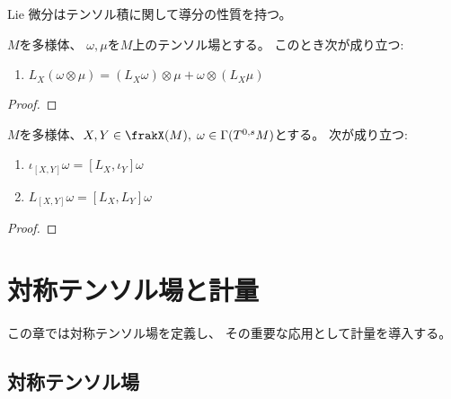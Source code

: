 \documentclass[report]{jlreq}
\begin{document}
Lie 微分はテンソル積に関して導分の性質を持つ。

\begin{proposition}
    $M$を多様体、
    $\omega, \mu$を$M$上のテンソル場とする。
    このとき次が成り立つ:
    \begin{enumerate}
        \item $L_X (\omega \otimes \mu)
            = (L_X \omega) \otimes \mu + \omega \otimes (L_X \mu)$
    \end{enumerate}
\end{proposition}

\begin{proof}
    \TODO{}
\end{proof}

\begin{proposition}
    $M$を多様体、$X, Y \in \frakX(M), \; \omega \in \Gamma(T^{0, s} M)$とする。
    次が成り立つ:
    \begin{enumerate}
        \item $\iota_{[X, Y]} \omega = [L_X, \iota_Y] \omega$
        \item $L_{[X, Y]} \omega = [L_X, L_Y] \omega$
    \end{enumerate}
\end{proposition}

\begin{proof}
    \TODO{}
\end{proof}

\begin{definition}[フローに関する不変性]
    \TODO{}
\end{definition}



%
\newpage
\chapter{対称テンソル場と計量}

この章では対称テンソル場を定義し、
その重要な応用として計量を導入する。

%
\section{対称テンソル場}
\end{document}
